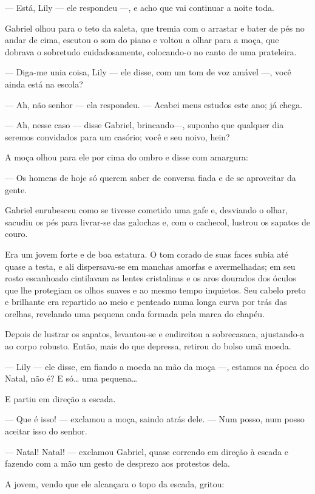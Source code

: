 --- Está, Lily --- ele respondeu ---, e acho que vai continuar a noite
toda.

Gabriel olhou para o teto da saleta, que tremia com o arrastar
e bater de pés no andar de cima, escutou o som do piano e voltou
a olhar para a moça, que dobrava o sobretudo cuidadosamente,
colocando-o no canto de uma prateleira.

--- Diga-me unia coisa, Lily --- ele disse, com um tom de voz amável
---, você ainda está na escola?

--- Ah, não senhor --- ela respondeu. --- Acabei meus estudos este
ano; já chega.

--- Ah, nesse caso --- disse Gabriel, brincando---, suponho que
qualquer dia seremos convidados para um casório; você e seu noivo,
hein?

A moça olhou para ele por cima do ombro e disse com amargura:

--- Os homens de hoje só querem saber de conversa fiada e de se
aproveitar da gente.

Gabriel enrubesceu como se tivesse cometido uma gafe e, desviando o
olhar, sacudiu os pés para livrar-se das galochas e, com o cachecol,
lustrou os sapatos de couro.

Era um jovem forte e de boa estatura. O tom corado de suas faces subia
até quase a testa, e ali dispersava-se em manchas amorfas e
avermelhadas; em seu rosto escanhoado cintilavam as lentes cristalinas
e os aros dourados dos óculos que lhe protegiam os olhos suaves e ao
mesmo tempo inquietos. Seu cabelo preto e brilhante era repartido ao
meio e penteado numa longa curva por trás das orelhas, revelando uma
pequena onda formada pela marca do chapéu.

Depois de lustrar os sapatos, levantou-se e endireitou a
sobrecasaca, ajustando-a ao corpo robusto. Então, mais do que
depressa, retirou do bolso umã moeda.

--- Lily --- ele disse, em fiando a moeda na mão da moça ---, estamos
na época do Natal, não é? E só\ldots{} uma pequena\ldots{}

E partiu em direção a escada.

--- Que é isso! --- exclamou a moça, saindo atrás dele. --- Num posso,
num posso aceitar isso do senhor.

--- Natal! Natal! --- exclamou Gabriel, quase correndo em direção à
escada e fazendo com a mão um gesto de desprezo aos protestos dela.

A jovem, vendo que ele alcançara o topo da escada, gritou:

